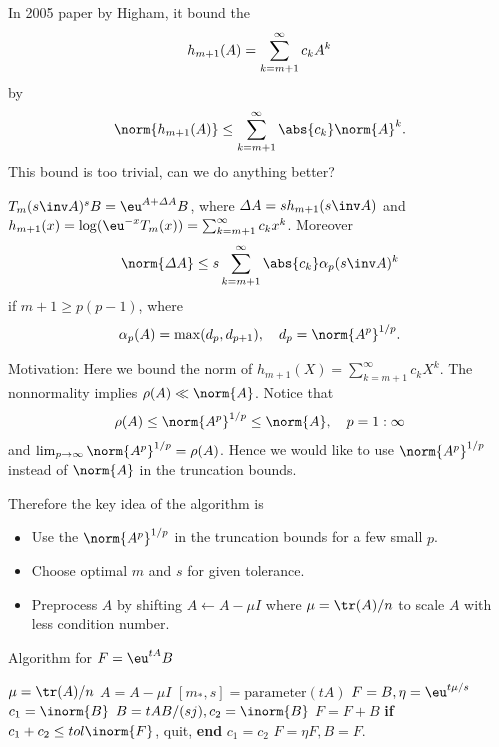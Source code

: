 \documentclass{article}
\begin{document}
In 2005 paper by Higham, it bound the 
\begin{equation}\notag
    h_{m+1}(A) = \sum_{k=m+1}^\infty c_kA^k
\end{equation}
by 
\begin{equation}\notag
    \norm{h_{m+1}(A)} \leq \sum_{k=m+1}^\infty \abs{c_k}\norm{A}^k.
\end{equation}
This bound is too trivial, can we do anything better?
\begin{lemma}
    $T_m(s\inv A)^s B = \eu^{A+\varDelta A}B$, where $\varDelta A =
    sh_{m+1}(s\inv A)$ and $h_{m+1}(x) = \log(\eu^{-x}T_m(x)) =
    \sum_{k=m+1}^\infty c_kx^k$. Moreover 
    \begin{equation}\notag
        \norm{\varDelta A} \leq s \sum_{k=m+1}^\infty \abs{c_k}\alpha_p(s\inv A)^k
    \end{equation}
    if $m+1\geq p(p-1)$, where 
    \begin{equation}\notag
        \alpha_p(A) = \max(d_p,d_{p+1}), \quad d_p = \norm{A^p}^{1/p}.
    \end{equation}
\end{lemma}

Motivation: Here we bound the norm of $h_{m+1}(X) = \sum_{k=m+1}^\infty
c_kX^k$. The nonnormality implies $\rho(A) \ll \norm{A}$. Notice that 
\begin{equation}\notag
    \rho(A) \leq \norm{A^p}^{1/p} \leq \norm{A}, \quad p = 1:\infty
\end{equation}
and $\lim_{p\to\infty}\norm{A^p}^{1/p} = \rho(A)$. Hence we would like
to use $\norm{A^p}^{1/p}$ instead of $\norm{A}$ in the truncation
bounds.

Therefore the key idea of the algorithm is 
\begin{itemize}
    \item Use the $\norm{A^p}^{1/p}$ in the truncation bounds for a few
    small $p$.
    \item Choose optimal $m$ and $s$ for given tolerance.
    \item Preprocess $A$ by shifting $A \leftarrow A - \mu I$ where $\mu
    = \tr(A)/n$ to scale $A$ with less condition number.
\end{itemize}

\begin{algorithm}
    \caption{Algorithm for $F = \eu^{tA}B$}
    \begin{algorithmic}[1]
        \State $\mu = \tr(A)/n$
        \State $A = A - \mu I$
        \State $[m_*,s] = \mathrm{parameter}(tA)$
        \State $F = B, \eta = \eu^{t\mu/s}$      
            \State  $c_1 = \inorm{B}$
                \State $B = tAB/(sj), c_2 = \inorm{B}$
                \State $F = F + B$
            \State \textbf{if} $c_1 + c_2 \leq tol \inorm{F}$, quit,
            \textbf{end}
            \State $c_1 = c_2$
            \EndFor
            \State $F = \eta F, B = F$.
        \EndFor
    \end{algorithmic}
\end{algorithm}
\end{document}
